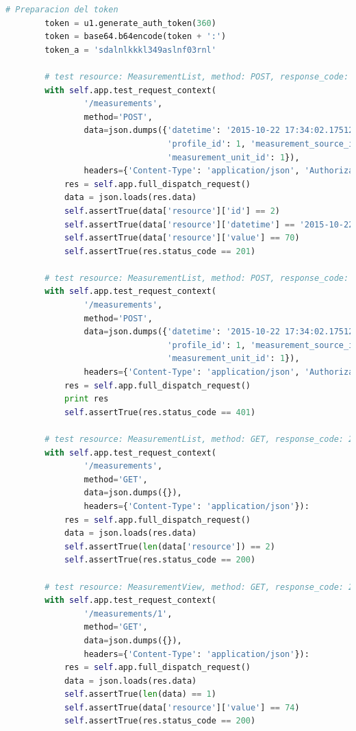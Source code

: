 \begin{itemize}
\begin{lstlisting}[language=Python]
        # Preparacion del token
        token = u1.generate_auth_token(360)
        token = base64.b64encode(token + ':')
        token_a = 'sdalnlkkkl349aslnf03rnl'

        # test resource: MeasurementList, method: POST, response_code: 201, con autorizacion
        with self.app.test_request_context(
                '/measurements',
                method='POST',
                data=json.dumps({'datetime': '2015-10-22 17:34:02.175126', 'value': 70, 'analysis_id': 1,
                                 'profile_id': 1, 'measurement_source_id': 1, 'measurement_type_id': 1,
                                 'measurement_unit_id': 1}),
                headers={'Content-Type': 'application/json', 'Authorization': 'Basic ' + token}):
            res = self.app.full_dispatch_request()
            data = json.loads(res.data)
            self.assertTrue(data['resource']['id'] == 2)
            self.assertTrue(data['resource']['datetime'] == '2015-10-22T17:34:02.175126')
            self.assertTrue(data['resource']['value'] == 70)
            self.assertTrue(res.status_code == 201)

        # test resource: MeasurementList, method: POST, response_code: 401, sin autorizacion, token invalido
        with self.app.test_request_context(
                '/measurements',
                method='POST',
                data=json.dumps({'datetime': '2015-10-22 17:34:02.175126', 'value': 68, 'analysis_id': 1,
                                 'profile_id': 1, 'measurement_source_id': 1, 'measurement_type_id': 1,
                                 'measurement_unit_id': 1}),
                headers={'Content-Type': 'application/json', 'Authorization': 'Basic ' + token_a}):
            res = self.app.full_dispatch_request()
            print res
            self.assertTrue(res.status_code == 401)

        # test resource: MeasurementList, method: GET, response_code: 200
        with self.app.test_request_context(
                '/measurements',
                method='GET',
                data=json.dumps({}),
                headers={'Content-Type': 'application/json'}):
            res = self.app.full_dispatch_request()
            data = json.loads(res.data)
            self.assertTrue(len(data['resource']) == 2)
            self.assertTrue(res.status_code == 200)

        # test resource: MeasurementView, method: GET, response_code: 200
        with self.app.test_request_context(
                '/measurements/1',
                method='GET',
                data=json.dumps({}),
                headers={'Content-Type': 'application/json'}):
            res = self.app.full_dispatch_request()
            data = json.loads(res.data)
            self.assertTrue(len(data) == 1)
            self.assertTrue(data['resource']['value'] == 74)
            self.assertTrue(res.status_code == 200)


\end{lstlisting}
\end{itemize}

